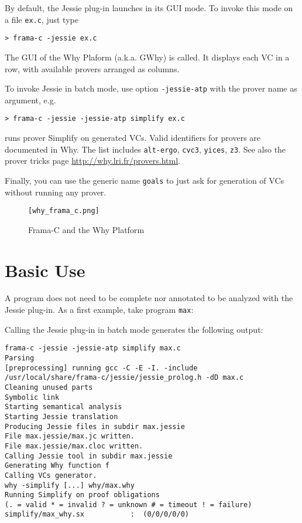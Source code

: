 \documentclass[a4paper,11pt,twoside,openright]{report}
\begin{document}
By default, the Jessie plug-in launches in its GUI mode. To invoke this
mode on a file \verb|ex.c|, just type

\begin{verbatim}
> frama-c -jessie ex.c
\end{verbatim}

The GUI of the Why Plaform (a.k.a. GWhy) is called. It displays each VC in a row, with available provers arranged as columns.

To invoke Jessie in batch mode, use option \verb|-jessie-atp| with the prover name as argument, e.g.
\begin{verbatim}
> frama-c -jessie -jessie-atp simplify ex.c
\end{verbatim}
runs prover Simplify on generated VCs. Valid identifiers for
provers are documented in Why. The list includes \verb|alt-ergo|,
\verb|cvc3|, \verb|yices|, \verb|z3|. See also the prover tricks page
\url{http://why.lri.fr/provers.html}.

Finally, you can use the generic name \verb|goals| to just ask for
generation of VCs without running any prover.

\begin{figure}[t]
  \begin{center}
  \verb|[why_frama_c.png]|
  \end{center}
  \caption{Frama-C and the Why Platform}
  \label{fig:platform}
\hrulefill
\end{figure}


\section{Basic Use}

A program does not need to be complete nor annotated to be analyzed
with the Jessie plug-in. As a first example, take program \verb|max|:



Calling the Jessie plug-in in batch mode generates the following output:

\begin{verbatim}
frama-c -jessie -jessie-atp simplify max.c
Parsing
[preprocessing] running gcc -C -E -I. -include
/usr/local/share/frama-c/jessie/jessie_prolog.h -dD max.c
Cleaning unused parts
Symbolic link
Starting semantical analysis
Starting Jessie translation
Producing Jessie files in subdir max.jessie
File max.jessie/max.jc written.
File max.jessie/max.cloc written.
Calling Jessie tool in subdir max.jessie
Generating Why function f
Calling VCs generator.
why -simplify [...] why/max.why
Running Simplify on proof obligations
(. = valid * = invalid ? = unknown # = timeout ! = failure)
simplify/max_why.sx           :  (0/0/0/0/0)
\end{verbatim}
\end{document}
